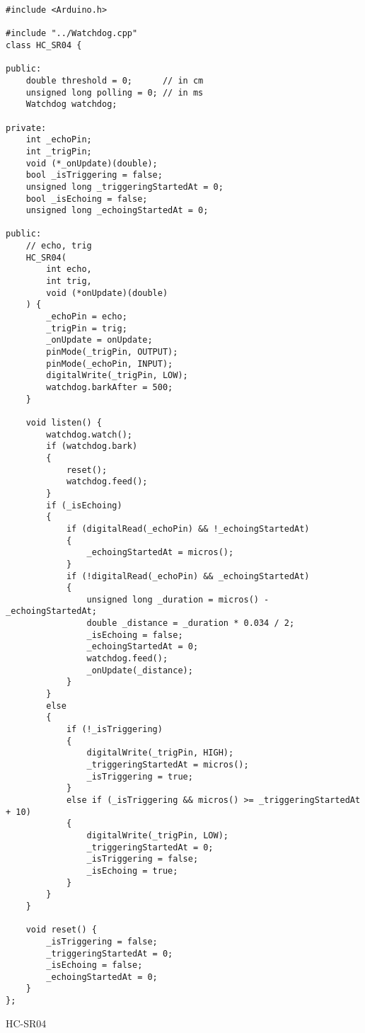 \begin{code}
\begin{verbatim}
#include <Arduino.h>

#include "../Watchdog.cpp"
class HC_SR04 {

public:
    double threshold = 0;      // in cm
    unsigned long polling = 0; // in ms
    Watchdog watchdog;

private:
    int _echoPin;
    int _trigPin;
    void (*_onUpdate)(double);
    bool _isTriggering = false;
    unsigned long _triggeringStartedAt = 0;
    bool _isEchoing = false;
    unsigned long _echoingStartedAt = 0;

public:
    // echo, trig
    HC_SR04(
        int echo,
        int trig,
        void (*onUpdate)(double)
    ) {
        _echoPin = echo;
        _trigPin = trig;
        _onUpdate = onUpdate;
        pinMode(_trigPin, OUTPUT);
        pinMode(_echoPin, INPUT);
        digitalWrite(_trigPin, LOW);
        watchdog.barkAfter = 500;
    }

    void listen() {
        watchdog.watch();
        if (watchdog.bark)
        {
            reset();
            watchdog.feed();
        }
        if (_isEchoing)
        {
            if (digitalRead(_echoPin) && !_echoingStartedAt)
            {
                _echoingStartedAt = micros();
            }
            if (!digitalRead(_echoPin) && _echoingStartedAt)
            {
                unsigned long _duration = micros() - _echoingStartedAt;
                double _distance = _duration * 0.034 / 2;
                _isEchoing = false;
                _echoingStartedAt = 0;
                watchdog.feed();
                _onUpdate(_distance);
            }
        }
        else
        {
            if (!_isTriggering)
            {
                digitalWrite(_trigPin, HIGH);
                _triggeringStartedAt = micros();
                _isTriggering = true;
            }
            else if (_isTriggering && micros() >= _triggeringStartedAt + 10)
            {
                digitalWrite(_trigPin, LOW);
                _triggeringStartedAt = 0;
                _isTriggering = false;
                _isEchoing = true;
            }
        }
    }
    
    void reset() {
        _isTriggering = false;
        _triggeringStartedAt = 0;
        _isEchoing = false;
        _echoingStartedAt = 0;
    }
};
\end{verbatim}
\caption{HC-SR04}
\end{code}